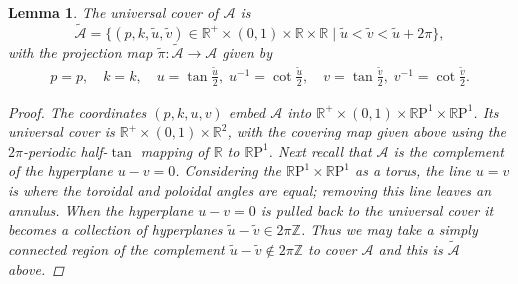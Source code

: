 \documentclass{article}
\numberwithin{equation}{section}
\numberwithin{figure}{section}
\newtheorem{lem}[equation]{Lemma}
\newcommand{\Z}{\mathbb{Z}}
\newcommand{\R}{\mathbb{R}}
\newcommand{\RP}{\mathbb{R}\text{P}}
\begin{document}
\begin{lem}\label{lem:mathcal tilde C}
The universal cover of $\mathcal{A}$ is
\[
\mathcal{\tilde{A}} =
\{(p, k,\tilde{u},\tilde{v}) \in \R^+\times(0,1)\times\R\times\R \mid  \tilde{u} < \tilde{v} < \tilde{u} + 2\pi \},
\]
with the projection map $\tilde{\pi} : \mathcal{\tilde{A}} \to \mathcal{A}$ given by
\begin{align*}
p = p,\quad 
k = k,\quad
u = \tan \frac{\tilde{u}}{2},\;
u^{-1} = \cot \frac{\tilde{u}}{2},\quad
v = \tan \frac{\tilde{v}}{2},\;
v^{-1} = \cot \frac{\tilde{v}}{2}.
\end{align*}

\begin{proof}
The coordinates $(p,k,u,v)$ embed $\mathcal{A}$ into $\R^+\times(0,1)\times \RP^1 \times \RP^1$. Its universal cover is $\R^+\times(0,1)\times\R^2$, with the covering map given above using the $2\pi$-periodic half-$\tan$ mapping of $\R$ to $\RP^1$. Next recall that $\mathcal{A}$ is the complement of the hyperplane $u-v = 0$.
Considering the $\RP^1\times\RP^1$ as a torus, the line $u=v$ is where the toroidal and poloidal angles are equal; removing this line leaves an annulus.
When the hyperplane $u-v=0$ is pulled back to the universal cover it becomes a collection of hyperplanes $\tilde{u}-\tilde{v} \in 2\pi\Z$. Thus we may take a simply connected region of the complement $\tilde{u}-\tilde{v} \not\in 2\pi\Z$ to cover $\mathcal{A}$ and this is $\mathcal{\tilde{A}}$ above.
\end{proof}
\end{lem}
\end{document}
